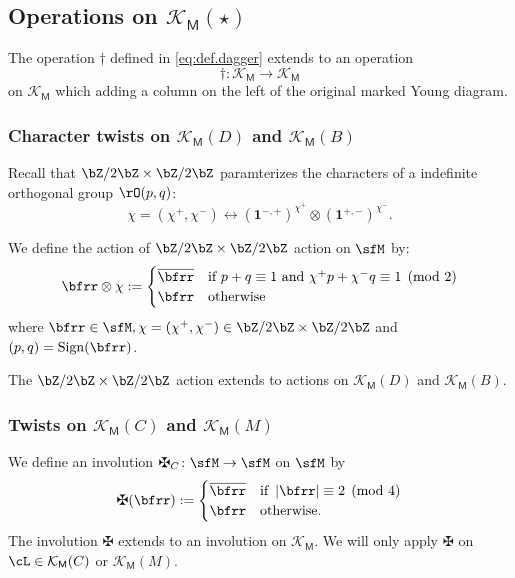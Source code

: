 \documentclass[12pt,a4paper]{amsart}
\newcommand{\bfone}{\mathbf{1}}
\def\abs#1{\left|{#1}\right|}
\def\KM{{\mathcal{K_{\mathsf{M}}}}}
\numberwithin{equation}{section}
\theoremstyle{remark}
\def\ssign{\mathrm{Sign}}
\let\ytb=\ytableaushort
\newcommand{\tytb}[1]{{\tiny\ytb{#1}}}
\def\umm{{=}}
\def\upp{{\ast}}
\def\upp{
  {{\setbox0\hbox{$\times$}
      \rlap{\hbox to \wd0{\hss$+$\hss}}\box0
    }}
}
\begin{document}
\subsection{Operations on $\KM(\star)$}
\def\npp{\#_{+}}
\def\nmm{\#_{-}}


The operation $\dagger$ defined in \eqref{eq:def.dagger} extends to an operation
\[
  \dagger \colon \KM\longrightarrow \KM
\]
on $\KM$ which adding a column on the left of the original marked Young diagram.


\subsubsection{Character twists on $\KM(D)$ and $\KM(B)$}
\label{sec:tchar.DB}
Recall that  $\bZ/2\bZ\times \bZ/2\bZ$ paramterizes
the characters of a indefinite orthogonal group $\rO(p,q)$:
\[
  \chi=(\chi^{+},\chi^{-})\longleftrightarrow (\bfone^{-,+})^{\chi^{+}}\otimes (\bfone^{+,-})^{\chi^{-}}.
\]

We define the action of $\bZ/2\bZ \times \bZ/2\bZ$ action on $\sfM$ by:
\[
  \bfrr \otimes \chi := \begin{cases}
    \overline{\bfrr} & \text{if } p+q \equiv 1 \text{ and }\chi^{+}p + \chi^{-} q\equiv 1 \pmod{2}\\
    \bfrr & \text{otherwise}%
  \end{cases}
\]
where $\bfrr\in \sfM, \chi=(\chi^{+},\chi^{-}) \in \bZ/2\bZ\times \bZ/2\bZ$ and
$(p,q)=\ssign(\bfrr)$.

The $\bZ/2\bZ\times \bZ/2\bZ$ action extends to actions on $\KM(D)$ and $\KM(B)$.




\subsubsection{Twists on $\KM(C)$ and $\KM(M)$}
We define an involution $\maltese_{C} \colon \sfM\rightarrow \sfM$ on $\sfM$ by
\[
  \maltese(\bfrr):= \begin{cases}
    \overline{\bfrr} & \text{if } \abs{\bfrr} \equiv 2 \pmod{4}\\
    \bfrr & \text{otherwise}.
  \end{cases}
\]
The involution $\maltese$ extends to an involution on $\KM$.%
We will only apply $\maltese$ on $\cL\in \KM(C)$ or $\KM(M)$.
\end{document}
